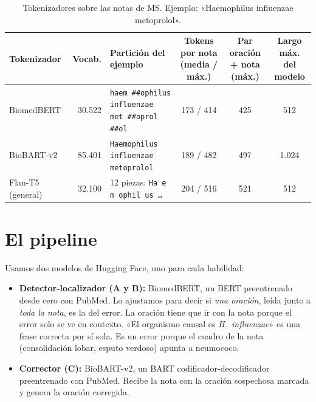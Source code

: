 \documentclass[11pt,a4paper]{article}
\begin{document}
\begin{table}[H]
\centering\footnotesize
\setlength{\tabcolsep}{4pt}
\caption{Tokenizadores sobre las notas de MS. Ejemplo: «Haemophilus influenzae metoprolol».}
\label{tab:tokens}
\begin{tabular}{lrlccc}
\toprule
Tokenizador & Vocab. & Partición del ejemplo & \makecell{Tokens por nota\\(media / máx.)} & \makecell{Par oración\\+ nota (máx.)} & \makecell{Largo máx.\\del modelo} \\
\midrule
BiomedBERT & 30.522 & \makecell[l]{\texttt{haem \#\#ophilus influenzae}\\\texttt{met \#\#oprol \#\#ol}} & 173 / 414 & 425 & 512 \\
BioBART-v2 & 85.401 & \makecell[l]{\texttt{Haemophilus influenzae}\\\texttt{metoprolol}} & 189 / 482 & 497 & 1.024 \\
Flan-T5 (general) & 32.100 & 12 piezas: \texttt{Ha e m ophil us \ldots} & 204 / 516 & 521 & 512 \\
\bottomrule
\end{tabular}
\end{table}

\section{El pipeline}

Usamos dos modelos de Hugging Face, uno para cada habilidad:
\begin{itemize}\setlength{\itemsep}{0pt}
  \item \textbf{Detector-localizador (A y B):} BiomedBERT,
    un BERT preentrenado desde cero con PubMed. Lo ajustamos para decir si \emph{una oración}, leída junto a
    \emph{toda la nota}, es la del error. La oración tiene que ir con la nota porque el error solo se ve en
    contexto. «El organismo causal es \emph{H.~influenzae}» es una frase correcta por sí sola. Es un error porque
    el cuadro de la nota (consolidación lobar, esputo verdoso) apunta a neumococo.
  \item \textbf{Corrector (C):} BioBART-v2, un BART codificador-decodificador
    preentrenado con PubMed. Recibe la nota con la oración sospechosa marcada y genera la oración corregida.
\end{itemize}
\end{document}
